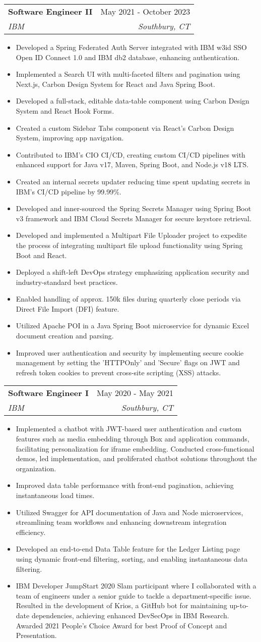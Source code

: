 \documentclass[letterpaper,11pt]{article}
\makeatletter
\newcommand{\resumeItem}[1]{
  \item[-] \small{
    {#1 \vspace{-2pt}}
  }
}
\newcommand{\resumeSubheading}[4]{
  \vspace{-2pt}\item
    \begin{tabular*}{0.97\textwidth}[t]{l@{\extracolsep{\fill}}r}
      \textbf{#1} & #2 \\
      \textit{\small#3} & \textit{\small #4} \\
    \end{tabular*}\vspace{-7pt}
}
\newcommand{\resumeItemListStart}{\begin{itemize}[rightmargin=\dimexpr\linewidth-17.25cm-\leftmargin\relax]}
\newcommand{\resumeItemListEnd}{\end{itemize}\vspace{-5pt}}
\makeatother
\begin{document}
\resumeSubheading
{Software Engineer II}{May 2021 - October 2023}
{IBM}{Southbury, CT}
\resumeItemListStart
\resumeItem{Developed a Spring Federated Auth Server integrated with IBM w3id SSO Open ID Connect 1.0 and IBM db2 database, enhancing authentication.}
\resumeItem{Implemented a Search UI with multi-faceted filters and pagination using Next.js, Carbon Design System for React and Java Spring Boot.}
\resumeItem{Developed a full-stack, editable data-table component using Carbon Design System and React Hook Forms.}
\resumeItem{Created a custom Sidebar Tabs component via React's Carbon Design System, improving app navigation.}
\resumeItem{Contributed to IBM's CIO CI/CD, creating custom CI/CD pipelines with enhanced support for Java v17, Maven, Spring Boot, and Node.js v18 LTS.}
\resumeItem{Created an internal secrets updater reducing time spent updating secrets in IBM's CI/CD pipeline by 99.99\%.}
\resumeItem{Developed and inner-sourced the Spring Secrets Manager using Spring Boot v3 framework and IBM Cloud Secrets Manager for secure keystore retrieval.}
\resumeItem{Developed and implemented a Multipart File Uploader project to expedite the process of integrating multipart file upload functionality using Spring Boot and React.}
\resumeItem{Deployed a shift-left DevOps strategy emphasizing application security and industry-standard best practices.}
\resumeItem{Enabled handling of approx. 150k files during quarterly close periods via Direct File Import (DFI) feature.}
\resumeItem{Utilized Apache POI in a Java Spring Boot microservice for dynamic Excel document creation and parsing.}
\resumeItem{Improved user authentication and security by implementing secure cookie management by setting the 'HTTPOnly' and 'Secure' flags on JWT and refresh token cookies to prevent cross-site scripting (XSS) attacks.}
\resumeItemListEnd

\resumeSubheading
{Software Engineer I}{May 2020 - May 2021}
{IBM}{Southbury, CT}
\resumeItemListStart
\resumeItem{Implemented a chatbot with JWT-based user authentication and custom features such as media embedding through Box and application commands, facilitating personalization for iframe embedding. Conducted cross-functional demos, led implementation, and proliferated chatbot solutions throughout the organization.}
\resumeItem{Improved data table performance with front-end pagination, achieving instantaneous load times.}
\resumeItem{Utilized Swagger for API documentation of Java and Node microservices, streamlining team workflows and enhancing downstream integration efficiency.}
\resumeItem{Developed an end-to-end Data Table feature for the Ledger Listing page using dynamic front-end filtering, sorting, and enabling instantaneous data filtering.}
\resumeItem{IBM Developer JumpStart 2020 Slam participant where I collaborated with a team of engineers under a senior guide to tackle a department-specific issue. Resulted in the development of Krios, a GitHub bot for maintaining up-to-date dependencies, achieving enhanced DevSecOps in IBM Research. Awarded 2021 People's Choice Award for best Proof of Concept and Presentation.}
\resumeItemListEnd
\end{document}
